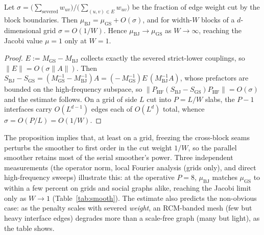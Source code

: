 \documentclass[review]{siamart220329}
\begin{document}
\begin{proposition}\label{prop:bj}
Let $\sigma=\big(\textstyle\sum_{\mathrm{severed}}w_{uv}\big)\big/\big(\sum_{(u,v)\in E}w_{uv}\big)$ be
the fraction of edge weight cut by the block boundaries. Then $\mu_{\mathrm{BJ}}=\mu_{\mathrm{GS}}+O(\sigma)$,
and for width-$W$ blocks of a $d$-dimensional grid $\sigma=O(1/W)$. Hence $\mu_{\mathrm{BJ}}\to\mu_{\mathrm{GS}}$
as $W\to\infty$, reaching the Jacobi value $\mu{=}1$ only at $W{=}1$.
\end{proposition}
\begin{proof}
$E:=M_{\mathrm{GS}}-M_{\mathrm{BJ}}$ collects exactly the severed strict-lower couplings, so
$\|E\|=O(\sigma\|A\|)$. Then $S_{\mathrm{BJ}}-S_{\mathrm{GS}}=(M_{\mathrm{GS}}^{-1}-M_{\mathrm{BJ}}^{-1})A
=(-\,M_{\mathrm{GS}}^{-1})E\,(M_{\mathrm{BJ}}^{-1}A)$, whose prefactors are bounded on the high-frequency
subspace, so $\|P_{\mathrm{HF}}(S_{\mathrm{BJ}}-S_{\mathrm{GS}})P_{\mathrm{HF}}\|=O(\sigma)$ and the
estimate follows. On a grid of side $L$ cut into $P{=}L/W$ slabs, the $P{-}1$ interfaces carry
$O(L^{d-1})$ edges each of $O(L^d)$ total, whence $\sigma=O(P/L)=O(1/W)$.
\end{proof}

The proposition implies that, at least on a grid, freezing the cross-block seams perturbs the smoother to first order in the cut weight $1/W$, so the parallel smoother retains most of the serial smoother's power. Three independent measurements (the operator norm, local Fourier analysis (grids only), and direct
high-frequency sweeps) illustrate this: at the operative
$P{=}8$, $\mu_{\mathrm{BJ}}$ matches $\mu_{\mathrm{GS}}$ to within a few percent on grids and social graphs
alike, reaching the Jacobi limit only as $W\to1$ (Table~\ref{tab:smooth}). The estimate also predicts the
non-obvious case: as the penalty scales with severed \emph{weight}, an RCM-banded mesh (few but heavy
interface edges) degrades more than a scale-free graph (many but light), as the table shows.
\end{document}
